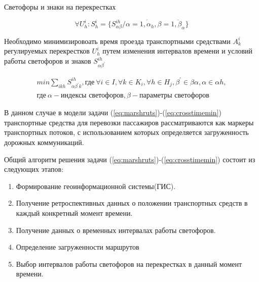 \documentclass[a4paper,13pt]{article}
\begin{document}
Светофоры и знаки на перекрестках

\begin{equation}\label{eq:crosstime}
\forall U_h^{i} :S^i_{h} = \{ S^{ih}_{\alpha \beta}/\alpha = \overline{1,{\alpha}_h} , \beta = \overline{1,{\beta}_{\alpha}} \}
\end{equation}

Необходимо минимизировоать время проезда транспортными средствами \begin{math}A^{i}_k\end{math} регулируемых перекрестков \begin{math}U^i_{h}\end{math} путем изменения интервалов времени и условий работы светофоров и знаков \begin{math}S^{ih}_{\alpha \beta^{\prime}}\end{math}

\begin{equation}\label{eq:crosstimemin}
\begin{split}
min \sum_{ikh} S^{ih}_{\alpha \beta^{\prime} k}, \text{где}\ \forall i \in I, \forall k \in K_i, \forall h \in H_j, \beta^{\prime} \in \beta \alpha , \alpha \in \alpha h , \\ \text{где}\ \alpha - \text{индексы светофоров}, \beta - \text{параметры светофоров}
\end{split}
\end{equation} 

В данном случае в модели задачи (\ref{eq:marshruts})-(\ref{eq:crosstimemin}) транспортные средства для перевозки пассажиров рассматриваются как маркеры транспортных потоков, с использованием которых определяется загруженность дорожных коммуникаций.

Общий алгоритм решения задачи (\ref{eq:marshruts})-(\ref{eq:crosstimemin}) состоит из следующих этапов:
\begin{enumerate}
\item Формирование геоинформационной системы(ГИС).
\item Получение ретроспективных данных о положении транспортных средств в каждый конкретный момент времени.
\item Получение данных о временных интервалах работы светофоров.
\item Определение загруженности маршрутов
\item Выбор интервалов работы светофоров на перекрестках в данный момент времени.
\end{enumerate}
\end{document}
